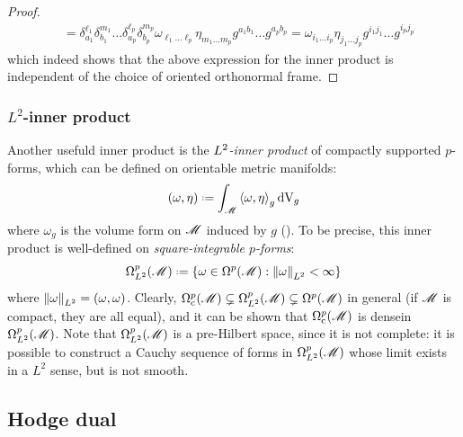 \begin{proofbox}
\begin{proof}
\begin{equation*}
\begin{split}
        & = \delta^{\ell_1}_{a_1} \delta^{m_1}_{b_1} \dots \delta^{\ell_p}_{a_p} \delta^{m_p}_{b_p} \omega_{\ell_1 \dots \ell_p} \eta_{m_1 \dots m_p} g^{a_1 b_1} \dots g^{a_p b_p} = \omega_{i_1 \dots i_p} \eta_{j_1 \dots j_p} g^{i_1 j_1} \dots g^{i_p j_p}
      \end{split}
    \end{equation*}
    which indeed shows that the above expression for the inner product is independent of the choice of oriented orthonormal frame.
  \end{proof}
\end{proofbox}

\subsubsection{\texorpdfstring{$ L^2 $}{L²}-inner product}

Another usefuld inner product is the \emph{$ L^2 $-inner product} of compactly supported $ p $-forms, which can be defined on orientable metric manifolds:
\begin{equation}
  (\omega , \eta) \defeq \int_\man \braket{\omega , \eta}_g \volfg
\end{equation}
where $ \omega_g $ is the volume form on $ \mathscr{M} $ induced by $ g $ (). To be precise, this inner product is well-defined on \emph{square-integrable $ p $-forms}:
\begin{equation}
  \dfs{p} \defeq \{\omega \in \df{p} : \norm{\omega}_{L^2} < \infty\}
\end{equation}
where $ \left\lVert\omega\right\rVert_{L^2} = (\omega , \omega) $. Clearly, $ \Omega_\text{c}^{p}(\mathscr{M}) \subsetneq \Omega_{L^2}^{p}(\mathscr{M}) \subsetneq \Omega^{p}(\mathscr{M}) $ in general (if $ \mathscr{M} $ is compact, they are all equal), and it can be shown that $ \Omega_\text{c}^{p}(\mathscr{M}) $ is dense\footnotemark in $ \Omega_{L^2}^{p}(\mathscr{M}) $. Note that $ \Omega_{L^2}^{p}(\mathscr{M}) $ is a pre-Hilbert space, since it is not complete: it is possible to construct a Cauchy sequence of forms in $ \Omega_{L^2}^{p}(\mathscr{M}) $ whose limit exists in a $ L^2 $ sense, but is not smooth.


\subsection{Hodge dual}

